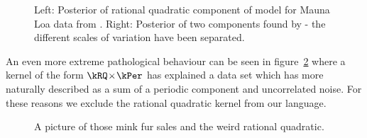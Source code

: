 \begin{figure}[ht]
\centering
{}
\caption{
Left: Posterior of rational quadratic component of model for Mauna Loa data from \citet{Duvenaud2013-dn}.
Right: Posterior of two components found by \procedurename{} - the different scales of variation have been separated.
}
\label{fig:rq}
\end{figure}

An even more extreme pathological behaviour can be seen in figure~\ref{fig:description:rq_per} where a kernel of the form $\kRQ \kerntimes \kPer$ has explained a data set which \procedurename{} has more naturally described as a sum of a periodic component and uncorrelated noise.
For these reasons we exclude the rational quadratic kernel from our language.

\begin{figure}[ht]
\centering
\caption{
A picture of those mink fur sales and the weird rational quadratic.
}
\label{fig:description:rq_per}
\end{figure}

